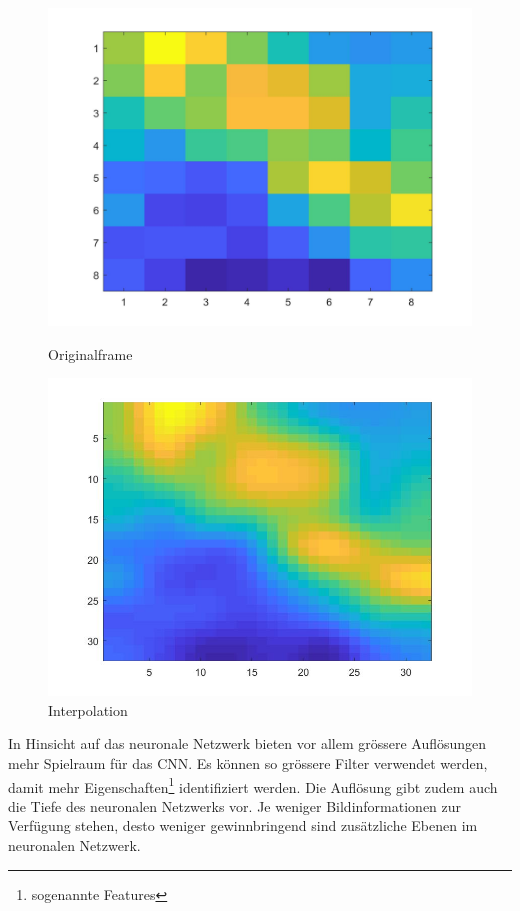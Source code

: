 \begin{figure}[!ht]
	\centering
	\begin{minipage}[c]{0.49\linewidth}
	\centering
	\includegraphics[width=1.0\linewidth]{fig/interpol_1}
	\caption[Originalframe]{Originalframe}
	\label{fig:interpol1}
	\end{minipage}
	\begin{minipage}[c]{0.49\linewidth}
		\centering
	\includegraphics[width=1.0\linewidth]{fig/interpol_2}
	\caption[bikubische interpoliert]{Interpolation}
	\label{fig:interpol2}
	\end{minipage}
\end{figure}

In Hinsicht auf das neuronale Netzwerk bieten vor allem grössere Auflösungen mehr Spielraum für das \ac{CNN}. Es können so grössere Filter verwendet werden, damit mehr Eigenschaften\footnote{sogenannte Features} identifiziert werden. Die Auflösung gibt zudem auch die Tiefe des neuronalen Netzwerks vor. Je weniger Bildinformationen zur Verfügung stehen, desto weniger gewinnbringend sind zusätzliche Ebenen im neuronalen Netzwerk. 

